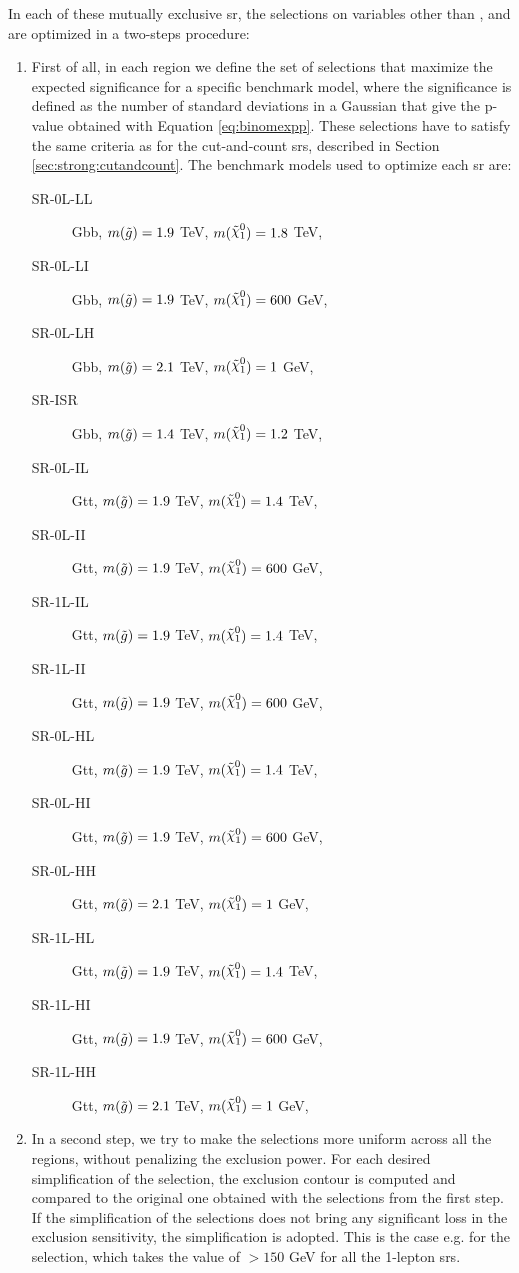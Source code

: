 In each of these mutually exclusive \gls{sr}, the selections on variables other than \njet, \nlep and \meff are optimized in a two-steps procedure:
\begin{enumerate}
\item First of all, in each region we define the set of selections that maximize the expected significance for a specific benchmark model, where the significance is defined as the number of standard deviations in a Gaussian that give the p-value obtained with Equation \ref{eq:binomexpp}. 
These selections have to satisfy the same criteria as for the cut-and-count \glspl{sr}, described in Section \ref{sec:strong:cutandcount}.
The benchmark models used to optimize each \gls{sr} are:
\begin{description}
\item[SR-0L-LL] Gbb, $m(\tilde{g}) = 1.9$ TeV, $m(\ninoone) = 1.8$ TeV,
\item[SR-0L-LI] Gbb, $m(\tilde{g}) = 1.9$ TeV, $m(\ninoone) = 600$ GeV,
\item[SR-0L-LH] Gbb, $m(\tilde{g}) = 2.1$ TeV, $m(\ninoone) = 1$ GeV,
\item[SR-ISR]   Gbb, $m(\tilde{g}) = 1.4$ TeV, $m(\ninoone) = 1.2$ TeV,

\item[SR-0L-IL] Gtt, $m(\tilde{g}) = 1.9$ TeV, $m(\ninoone) = 1.4$ TeV,
\item[SR-0L-II] Gtt, $m(\tilde{g}) = 1.9$ TeV, $m(\ninoone) = 600$ GeV,

\item[SR-1L-IL] Gtt, $m(\tilde{g}) = 1.9$ TeV, $m(\ninoone) = 1.4$ TeV,
\item[SR-1L-II] Gtt, $m(\tilde{g}) = 1.9$ TeV, $m(\ninoone) = 600$ GeV,

\item[SR-0L-HL] Gtt, $m(\tilde{g}) = 1.9$ TeV, $m(\ninoone) = 1.4$ TeV,
\item[SR-0L-HI] Gtt, $m(\tilde{g}) = 1.9$ TeV, $m(\ninoone) = 600$ GeV,
\item[SR-0L-HH] Gtt, $m(\tilde{g}) = 2.1$ TeV, $m(\ninoone) = 1$ GeV,

\item[SR-1L-HL] Gtt, $m(\tilde{g}) = 1.9$ TeV, $m(\ninoone) = 1.4$ TeV,
\item[SR-1L-HI] Gtt, $m(\tilde{g}) = 1.9$ TeV, $m(\ninoone) = 600$ GeV,
\item[SR-1L-HH] Gtt, $m(\tilde{g}) = 2.1$ TeV, $m(\ninoone) = 1$ GeV,

\end{description}


\item In a second step, we try to make the selections more uniform across all the regions, without penalizing the exclusion power. 
For each desired simplification of the selection, the exclusion contour is computed and compared to the original one obtained with the selections from the first step. If the simplification of the selections does not bring any significant loss in the exclusion sensitivity, the simplification is adopted. This is the case e.g. for the \mt selection, which takes the value of $>150$ GeV for all the 1-lepton \glspl{sr}.
\end{enumerate}



